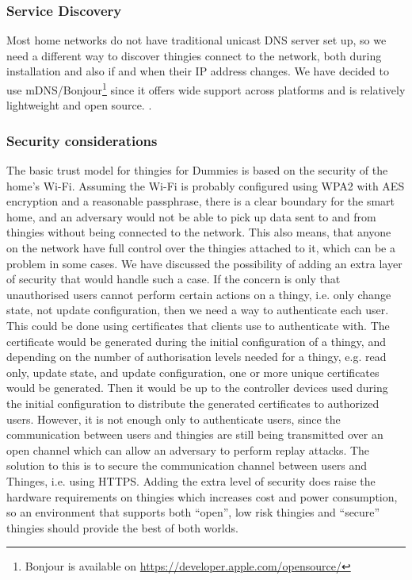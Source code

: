 \documentclass{ubicomp2012}
\begin{document}
\subsubsection{Service Discovery}
Most home networks do not have traditional unicast DNS server set up, so we need a different way to discover thingies connect to the network, both during installation and also if and when their IP address changes. We have decided to use mDNS/Bonjour\footnote{Bonjour is available on \url{https://developer.apple.com/opensource/}} since it offers wide support across platforms and is relatively lightweight and open source. .
\subsubsection{Security considerations}

The basic trust model for thingies for Dummies is based on the security of the home's Wi-Fi. Assuming the Wi-Fi is probably configured using WPA2 with AES encryption and a reasonable passphrase, there is a clear boundary for the smart home, and an adversary would not be able to pick up data sent to and from thingies without being connected to the network. This also means, that anyone on the network have full control over the thingies attached to it, which can be a problem in some cases. We have discussed the possibility of adding an extra layer of security that would handle such a case. If the concern is only that unauthorised users cannot perform certain actions on a thingy, i.e. only change state, not update configuration, then we need a way to authenticate each user. This could be done using certificates that clients use to authenticate with. The certificate would be generated during the initial configuration of a thingy, and depending on the number of authorisation levels needed for a thingy, e.g. read only, update state, and update configuration, one or more unique certificates would be generated. Then it would be up to the controller devices used during the initial configuration to distribute the generated certificates to authorized users. However, it is not enough only to authenticate users, since the communication between users and thingies are still being transmitted over an open channel which can allow an adversary to perform replay attacks. The solution to this is to secure the communication channel between users and Thinges, i.e. using HTTPS. Adding the extra level of security does raise the hardware requirements on thingies which increases cost and power consumption, so an environment that supports both ``open'', low risk thingies and ``secure'' thingies should provide the best of both worlds.
\end{document}
